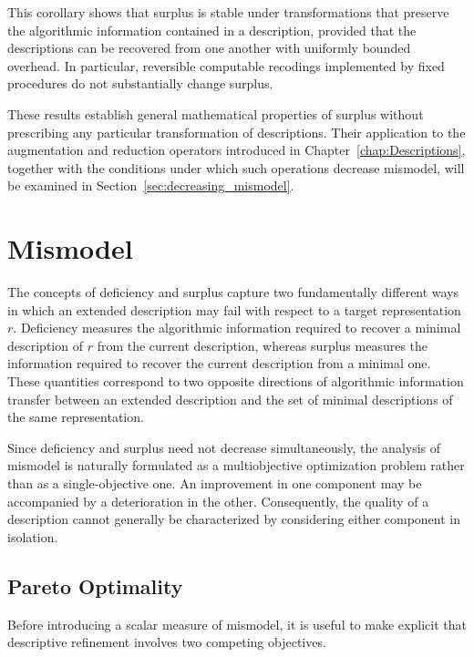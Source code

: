 This corollary shows that surplus is stable under transformations that preserve the algorithmic information contained in a description, provided that the descriptions can be recovered from one another with uniformly bounded overhead. In particular, reversible computable recodings implemented by fixed procedures do not substantially change surplus.

These results establish general mathematical properties of surplus without prescribing any particular transformation of descriptions. Their application to the augmentation and reduction operators introduced in
Chapter~\ref{chap:Descriptions}, together with the conditions under which such operations decrease mismodel, will be examined in Section~\ref{sec:decreasing_mismodel}.

%
%

\section{Mismodel}
\label{sec:mismodel_description}

The concepts of deficiency and surplus capture two fundamentally different ways in which an extended description may fail with respect to a target representation $r$. Deficiency measures the algorithmic information required to recover a minimal description of $r$ from the current description, whereas surplus measures the information required to recover the current description from a minimal one. These quantities correspond to two opposite directions of algorithmic information transfer between an extended description and the set of minimal descriptions of the same representation.

Since deficiency and surplus need not decrease simultaneously, the analysis of mismodel is naturally formulated as a multiobjective optimization problem rather than as a single-objective one. An improvement in one component may be accompanied by a deterioration in the other. Consequently, the quality of a description cannot generally be characterized by considering either component in isolation.


\subsection*{Pareto Optimality}

Before introducing a scalar measure of mismodel, it is useful to make explicit that descriptive refinement involves two competing objectives.


